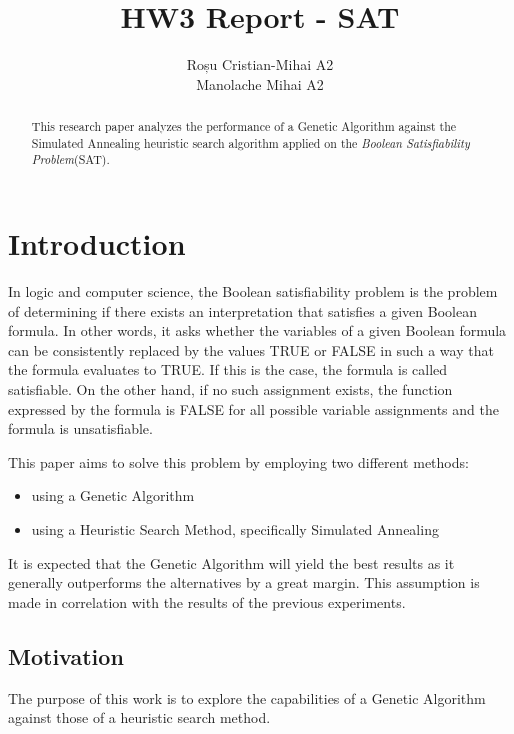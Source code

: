 \documentclass{article}
\author{Roșu Cristian-Mihai A2 \\ Manolache Mihai A2}
\title{HW3 Report - SAT}
\begin{document}

\maketitle

\begin{abstract}
This research paper analyzes the performance of a Genetic Algorithm against
the Simulated Annealing heuristic search algorithm applied on the 
\textit{Boolean Satisfiability Problem}(SAT).
\end{abstract}

\section{Introduction}
In logic and computer science, the Boolean satisfiability problem is the 
problem of determining if there exists an interpretation that satisfies a 
given Boolean formula. In other words, it asks whether the variables of a 
given Boolean formula can be consistently replaced by the values TRUE or 
FALSE in such a way that the formula evaluates to TRUE. If this is the case, 
the formula is called satisfiable. 
On the other hand, if no such assignment exists, the function expressed by 
the formula is FALSE for all possible variable assignments and the formula 
is unsatisfiable. \cite{wiki}

This paper aims to solve this problem by employing two different methods:

\begin{itemize}
    \item using a Genetic Algorithm
    \item using a Heuristic Search Method, specifically Simulated Annealing
\end{itemize}

It is expected that the Genetic Algorithm will yield the best results as it
generally outperforms the alternatives by a great margin. This assumption is
made in correlation with the results of the previous experiments.

\subsection{Motivation} 
The purpose of this work is to explore the capabilities of a Genetic Algorithm
against those of a heuristic search method.
\end{document}
